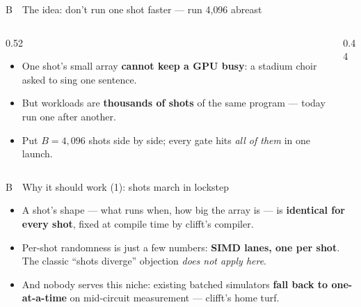 \documentclass[aspectratio=169,11pt]{beamer}
\newcommand{\accentB}{\colorlet{framerule}{teal}}
\newcommand{\punch}[1]{{\color{framerule}\bfseries #1}}
\begin{document}
\accentB
\begin{frame}{B \,\textperiodcentered\, The idea: don't run one shot faster --- run 4{,}096 abreast}
  \begin{columns}[T]
    \begin{column}{0.52\textwidth}
      \begin{itemize}
        \item One shot's small array \punch{cannot keep a GPU busy}: a stadium choir asked to sing one sentence.
        \item But workloads are \punch{thousands of shots} of the same program --- today run one after another.
        \item Put $B{=}4{,}096$ shots side by side; every gate hits \emph{all of them} in one launch.
      \end{itemize}
    \end{column}
    \begin{column}{0.44\textwidth}
      \centering
    \end{column}
  \end{columns}
\end{frame}

\begin{frame}{B \,\textperiodcentered\, Why it should work (1): shots march in lockstep}
  \begin{itemize}
    \item A shot's shape --- what runs when, how big the array is --- is \punch{identical for every shot}, fixed at compile time by clifft's compiler.
    \item Per-shot randomness is just a few numbers: \punch{SIMD lanes, one per shot}. The classic ``shots diverge'' objection \emph{does not apply here}.
    \item And nobody serves this niche: existing batched simulators \punch{fall back to one-at-a-time} on mid-circuit measurement --- clifft's home turf.
  \end{itemize}
\end{frame}
\end{document}
